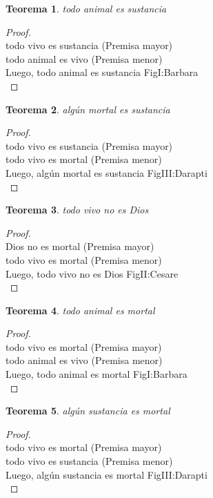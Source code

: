 ﻿\documentclass[12pt]{book}
\newtheorem{theorem}{Teorema}[chapter]
\newtheorem{proof}{Demostración}
\begin{document}
\begin{theorem}
todo animal es sustancia
\label{th: 27}
\end{theorem}\begin{proof}\\todo vivo es sustancia	 (Premisa mayor) \\todo animal es vivo	 (Premisa menor) \\Luego, todo animal es sustancia	FigI:Barbara \\ \end{proof}
\begin{theorem}
algún mortal es sustancia
\label{th: 28}
\end{theorem}\begin{proof}\\todo vivo es sustancia	 (Premisa mayor) \\todo vivo es mortal	 (Premisa menor) \\Luego, algún mortal es sustancia	FigIII:Darapti \\ \end{proof}
\begin{theorem}
todo vivo no es Dios
\label{th: 29}
\end{theorem}\begin{proof}\\Dios no es mortal	 (Premisa mayor) \\todo vivo es mortal	 (Premisa menor) \\Luego, todo vivo no es Dios	FigII:Cesare \\ \end{proof}
\begin{theorem}
todo animal es mortal
\label{th: 30}
\end{theorem}\begin{proof}\\todo vivo es mortal	 (Premisa mayor) \\todo animal es vivo	 (Premisa menor) \\Luego, todo animal es mortal	FigI:Barbara \\ \end{proof}
\begin{theorem}
algún sustancia es mortal
\label{th: 31}
\end{theorem}\begin{proof}\\todo vivo es mortal	 (Premisa mayor) \\todo vivo es sustancia	 (Premisa menor) \\Luego, algún sustancia es mortal	FigIII:Darapti \\ \end{proof}
\end{document}
